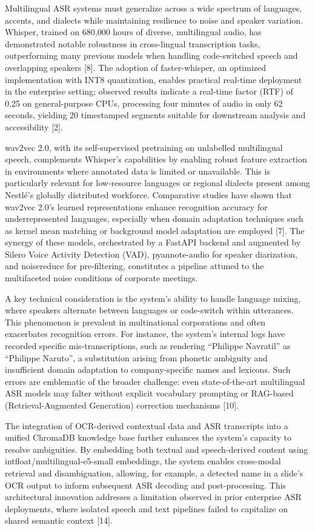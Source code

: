 \documentclass[12pt,a4paper]{article}
\begin{document}
Multilingual ASR systems must generalize across a wide spectrum of languages, accents, and dialects while maintaining resilience to noise and speaker variation. Whisper, trained on 680,000 hours of diverse, multilingual audio, has demonstrated notable robustness in cross-lingual transcription tasks, outperforming many previous models when handling code-switched speech and overlapping speakers [8]. The adoption of faster-whisper, an optimized implementation with INT8 quantization, enables practical real-time deployment in the enterprise setting; observed results indicate a real-time factor (RTF) of 0.25 on general-purpose CPUs, processing four minutes of audio in only 62 seconds, yielding 20 timestamped segments suitable for downstream analysis and accessibility [2].


wav2vec 2.0, with its self-supervised pretraining on unlabelled multilingual speech, complements Whisper’s capabilities by enabling robust feature extraction in environments where annotated data is limited or unavailable. This is particularly relevant for low-resource languages or regional dialects present among Nestlé’s globally distributed workforce. Comparative studies have shown that wav2vec 2.0’s learned representations enhance recognition accuracy for underrepresented languages, especially when domain adaptation techniques such as kernel mean matching or background model adaptation are employed [7]. The synergy of these models, orchestrated by a FastAPI backend and augmented by Silero Voice Activity Detection (VAD), pyannote-audio for speaker diarization, and noisereduce for pre-filtering, constitutes a pipeline attuned to the multifaceted noise conditions of corporate meetings.


A key technical consideration is the system’s ability to handle language mixing, where speakers alternate between languages or code-switch within utterances. This phenomenon is prevalent in multinational corporations and often exacerbates recognition errors. For instance, the system’s internal logs have recorded specific mis-transcriptions, such as rendering “Philippe Navratil” as “Philippe Naruto”, a substitution arising from phonetic ambiguity and insufficient domain adaptation to company-specific names and lexicons. Such errors are emblematic of the broader challenge: even state-of-the-art multilingual ASR models may falter without explicit vocabulary prompting or RAG-based (Retrieval-Augmented Generation) correction mechanisms [10].


The integration of OCR-derived contextual data and ASR transcripts into a unified ChromaDB knowledge base further enhances the system’s capacity to resolve ambiguities. By embedding both textual and speech-derived content using intfloat/multilingual-e5-small embeddings, the system enables cross-modal retrieval and disambiguation, allowing, for example, a detected name in a slide’s OCR output to inform subsequent ASR decoding and post-processing. This architectural innovation addresses a limitation observed in prior enterprise ASR deployments, where isolated speech and text pipelines failed to capitalize on shared semantic context [14].
\end{document}
